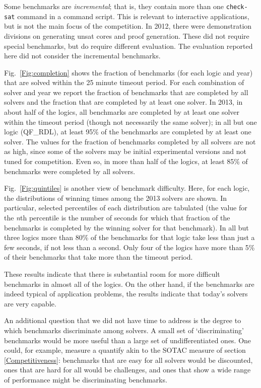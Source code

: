 \documentclass[smallcondensed]{svjour3}
\begin{document}
Some benchmarks are {\em incremental}; that is, they contain more than one {\tt check-sat} command in a command script. This is relevant to interactive applications, but is not the main focus of the competition. In 2012, there were demonstration divisions on generating unsat cores and proof generation. These did not require special benchmarks, but do require different evaluation. The evaluation reported here did not consider the incremental benchmarks.


Fig.~\ref{Fig:completion} shows the fraction of benchmarks (for each logic and year) that are solved within the 25 minute timeout period. For each combination of solver and year we report the fraction of benchmarks that are completed by all solvers and the fraction that are completed by at least one solver. In 2013, in about half of the logics, all benchmarks are completed by at least one solver within the timeout period (though not necessarily the same solver); in all but one logic (QF\_RDL), at least 95\% of the benchmarks are completed by at least one solver. The values for the fraction of benchmarks completed by all solvers are not as high, since some of the solvers may be initial experimental versions and not tuned for competition. Even so, in more than half of the logics, at least 85\% of benchmarks were completed by all solvers.

Fig.~\ref{Fig:quintiles} is another view of benchmark difficulty. Here, for each logic, the distributions of winning times among the 2013 solvers are shown. In particular, selected
percentiles of each distribution are tabulated (the value for the {\em n}th percentile is the number of seconds for which that fraction of the benchmarks is completed by the winning solver for that benchmark). In all but three logics more than 80\% of the benchmarks for that logic take less than just a few seconds, if not less than a second. Only four of the logics have more than 5\% of their benchmarks that take more than the timeout period.
 
These results indicate that there is substantial room for more difficult benchmarks in almost all of the logics. On the other hand, if the benchmarks are indeed typical of application problems, the results indicate that today's solvers are very capable.

An additional question that we did not have time to address is the degree to which benchmarks discriminate among solvers. A small set of `discriminating' benchmarks would be more useful than a large set of undifferentiated ones. One could, for example, measure a quantify akin to the SOTAC measure of section \ref{Competitiveness}: benchmarks that are easy for all solvers would be discounted, ones that are hard for all would be challenges, and ones that show a wide range of performance might be discriminating benchmarks.
 
\end{document}
